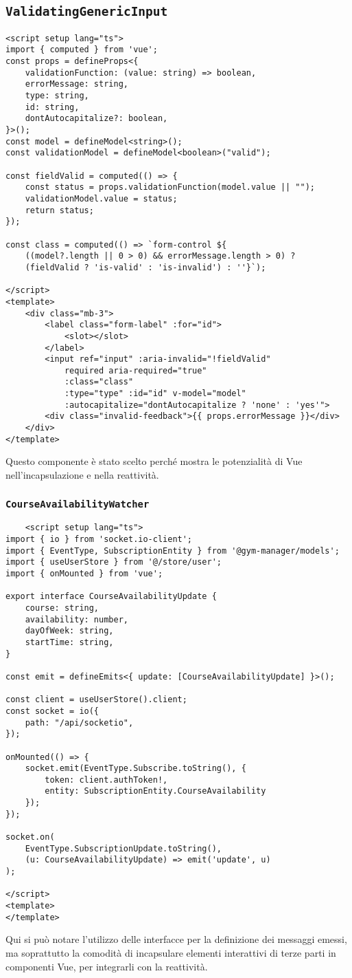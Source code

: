 \documentclass{report}
\begin{document}
\subsection{\texttt{ValidatingGenericInput}}
\begin{verbatim}
<script setup lang="ts">
import { computed } from 'vue';
const props = defineProps<{
    validationFunction: (value: string) => boolean,
    errorMessage: string,
    type: string,
    id: string,
    dontAutocapitalize?: boolean,
}>();
const model = defineModel<string>(); 
const validationModel = defineModel<boolean>("valid");

const fieldValid = computed(() => {
    const status = props.validationFunction(model.value || "");
    validationModel.value = status;
    return status;
});

const class = computed(() => `form-control ${
    ((model?.length || 0 > 0) && errorMessage.length > 0) ?
    (fieldValid ? 'is-valid' : 'is-invalid') : ''}`);

</script>
<template>
    <div class="mb-3">
        <label class="form-label" :for="id">
            <slot></slot>
        </label>
        <input ref="input" :aria-invalid="!fieldValid"
            required aria-required="true"
            :class="class"
            :type="type" :id="id" v-model="model"
            :autocapitalize="dontAutocapitalize ? 'none' : 'yes'">
        <div class="invalid-feedback">{{ props.errorMessage }}</div>
    </div>
</template>
\end{verbatim}
\par Questo componente è stato scelto perché mostra le potenzialità di Vue nell'incapsulazione e nella reattività.
\subsubsection{\texttt{CourseAvailabilityWatcher}}
\begin{verbatim}
    <script setup lang="ts">
import { io } from 'socket.io-client';
import { EventType, SubscriptionEntity } from '@gym-manager/models';
import { useUserStore } from '@/store/user';
import { onMounted } from 'vue';

export interface CourseAvailabilityUpdate {
    course: string,
    availability: number,
    dayOfWeek: string,
    startTime: string,
}

const emit = defineEmits<{ update: [CourseAvailabilityUpdate] }>();

const client = useUserStore().client;
const socket = io({
    path: "/api/socketio",
});

onMounted(() => {
    socket.emit(EventType.Subscribe.toString(), {
        token: client.authToken!,
        entity: SubscriptionEntity.CourseAvailability
    });
});

socket.on(
    EventType.SubscriptionUpdate.toString(),
    (u: CourseAvailabilityUpdate) => emit('update', u)
);

</script>
<template>
</template>
\end{verbatim}
\par Qui si può notare l'utilizzo delle interfacce per la definizione dei messaggi emessi, ma soprattutto la comodità di incapsulare elementi interattivi di terze parti in componenti Vue, per integrarli con la reattività.
\end{document}
